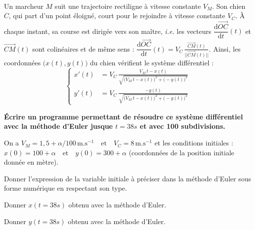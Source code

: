\setcounter{numques}{0}~\\

Un marcheur $M$ suit une trajectoire rectiligne à vitesse constante $V_M$. Son chien $C$, qui part d'un point éloigné, court pour le rejoindre à vitesse constante $V_C$. \`{A} chaque instant, sa course est dirigée vers son maître, \textit{i.e.} les vecteurs $\dfrac{\text{d}\overrightarrow{OC}}{\text{d}t}(t)$ et $\overrightarrow{CM}(t)$ sont colinéaires et de même sens :
$ \dfrac{\text{d}\overrightarrow{OC}}{\text{d}t}(t)=V_C\,\frac{\overrightarrow{CM}(t)}{\vert\vert\overrightarrow{CM}(t)\vert\vert}$. 
Ainsi, les coordonnées $\big(x(t),y(t)\big)$ du chien vérifient le système différentiel :
\[ \left\{ \begin{aligned} x'(t)&=V_C\,\frac{V_M\,t-x(t)}{\sqrt{\big( V_M\,t-x(t) \big)^2+\big( -y(t) \big)^2}} \\ y'(t)&=V_C\,\frac{-y(t)}{\sqrt{\big( V_M\,t-x(t) \big)^2+\big( -y(t) \big)^2}} \end{aligned} \right. \]
 
 \textbf{\'{E}crire un programme permettant de résoudre ce système différentiel avec la méthode d'Euler jusque $t=38s$ et avec 100 subdivisions.}

On a $V_M=1{,}5+\alpha/100\,\text{m}.\text{s}^{-1} \quad \text{et} \quad V_C=8\,\text{m}.\text{s}^{-1} $
		et les conditions initiales :
		$ x(0)=100+\alpha  \quad \text{et} \quad y(0)=300+\alpha$ (coordonnées de la position initiale donnée en mètre). 

\question{} Donner l'expression de la variable initiale à préciser dans la méthode d'Euler sous forme numérique en respectant son type.

\question{} Donner $x(t=38s)$ obtenu avec la méthode d'Euler.

\question{} Donner $y(t=38s)$ obtenu avec la méthode d'Euler.